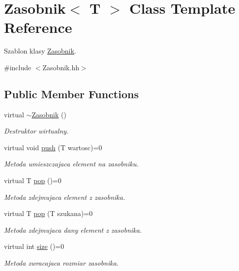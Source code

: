 \hypertarget{a00019}{}\section{Zasobnik$<$ T $>$ Class Template Reference}
\label{a00019}


Szablon klasy \hyperlink{a00019}{Zasobnik}.  




{\ttfamily \#include $<$Zasobnik.\+hh$>$}

\subsection*{Public Member Functions}
\begin{DoxyCompactItemize}
\item 
virtual \hyperlink{a00019_ab8d4ec71166fd24d7e717cc35808fe5d}{$\sim$\+Zasobnik} ()
\begin{DoxyCompactList}\small\item\em Destruktor wirtualny. \end{DoxyCompactList}\item 
virtual void \hyperlink{a00019_a2d4e12285da6c0772a56d70cd90ca436}{push} (T wartosc)=0
\begin{DoxyCompactList}\small\item\em Metoda umieszczajaca element na zasobniku. \end{DoxyCompactList}\item 
virtual T \hyperlink{a00019_a6c4f8b78dd20289be7d1625bcd48e899}{pop} ()=0
\begin{DoxyCompactList}\small\item\em Metoda zdejmujaca element z zasobnika. \end{DoxyCompactList}\item 
virtual T \hyperlink{a00019_a13b917f6298d941d147e974ffd94f7d0}{pop} (T szukana)=0
\begin{DoxyCompactList}\small\item\em Metoda zdejmujaca dany element z zasobnika. \end{DoxyCompactList}\item 
virtual int \hyperlink{a00019_aeddc93b1e43aab6f59a60612bf42ed50}{size} ()=0
\begin{DoxyCompactList}\small\item\em Metoda zwracajaca rozmiar zasobnika. \end{DoxyCompactList}\end{DoxyCompactItemize}


